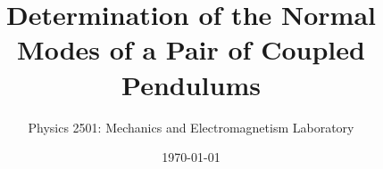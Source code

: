 \documentclass{revtex4}
\begin{document}

\title{Determination of the Normal Modes of a Pair of Coupled Pendulums}


\author{Physics 2501: Mechanics and Electromagnetism Laboratory}


\date{\today}



\setlength{\topmargin}{0in}

\maketitle

\end{document}
